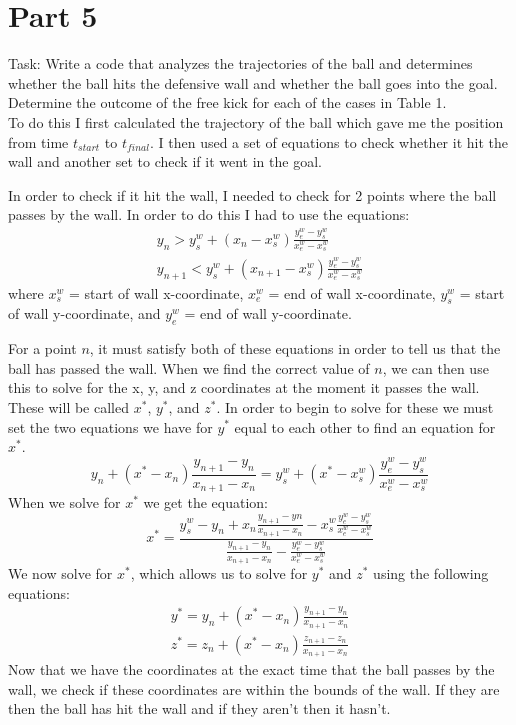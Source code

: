 \documentclass[12pt]{article}
\begin{document}
\newpage
\section*{Part 5}\label{sec::Part 5}
\noindent Task: Write a code that analyzes the trajectories of the ball and determines whether the ball hits the defensive wall and whether the ball goes into the goal. Determine the outcome of the free kick for each of the cases in Table 1.\\

To do this I first calculated the trajectory of the ball which gave me the position from time $t_{start}$ to $t_{final}$. I then used a set of equations to check whether it hit the wall and another set to check if it went in the goal. 

In order to check if it hit the wall, I needed to check for 2 points where the ball passes by the wall. In order to do this I had to use the equations:
\begin{eqnarray}
y_{n} > y_{s}^{w} + (x_{n} - x_{s}^{w})\frac{y_{e}^{w} - y_{s}^{w}}{x_{e}^{w} - x_{s}^{w}}\\\nonumber
y_{n+1} < y_{s}^{w} + (x_{n+1} - x_{s}^{w})\frac{y_{e}^{w} - y_{s}^{w}}{x_{e}^{w} - x_{s}^{w}}\nonumber
\end{eqnarray}
where $x_{s}^{w}$ = start of wall x-coordinate, $x_{e}^{w}$ = end of wall x-coordinate, $y_{s}^{w}$ = start of wall y-coordinate, and $y_{e}^{w}$ = end of wall y-coordinate.

For a point $n$, it must satisfy both of these equations in order to tell us that the ball has passed the wall. When we find the correct value of $n$, we can then use this to solve for the x, y, and z coordinates at the moment it passes the wall. These will be called $x^{*}$, $y^{*}$, and $z^{*}$. In order to begin to solve for these we must set the two equations we have for $y^{*}$ equal to each other to find an equation for $x^{*}$.
\begin{equation}
y_{n} + (x^{*} - x_{n})\frac{y_{n+1} - y_{n}}{x_{n+1} - x_{n}} = y_{s}^{w} + (x^{*} - x_{s}^{w})\frac{y_{e}^{w} - y_{s}^{w}}{x_{e}^{w} - x_{s}^{w}}
\end{equation}
When we solve for $x^{*}$ we get the equation:
\begin{equation}
x^{*} = \frac{y_{s}^{w} - y_{n} + x_{n}\frac{y_{n+1} - y{n}}{x_{n+1} - x_{n}} - x_{s}^{w}\frac{y_{e}^{w} - y_{s}^{w}}{x_{e}^{w} - x_{s}^{w}}}{\frac{y_{n+1} - y_{n}}{x_{n+1} - x_{n}} - \frac{y_{e}^{w} - y_{s}^{w}}{x_{e}^{w} - x_{s}^{w}}}
\end{equation}
We now solve for $x^{*}$, which allows us to solve for $y^{*}$ and $z^{*}$ using the following equations:
\begin{eqnarray}
y^{*} = y_{n} + (x^{*} - x_{n})\frac{y_{n+1} - y_{n}}{x_{n+1} - x_{n}}\\\nonumber
z^{*} = z_{n} + (x^{*} - x_{n})\frac{z_{n+1} - z_{n}}{x_{n+1} - x_{n}}\nonumber
\end{eqnarray}
Now that we have the coordinates at the exact time that the ball passes by the wall, we check if these coordinates are within the bounds of the wall. If they are then the ball has hit the wall and if they aren't then it hasn't.
\end{document}
